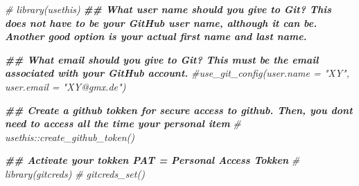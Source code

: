 \documentclass[
]{article}
\newenvironment{Shaded}{\begin{snugshade}}{\end{snugshade}}
\newcommand{\CommentTok}[1]{\textcolor[rgb]{0.56,0.35,0.01}{\textit{#1}}}
\newcommand{\DocumentationTok}[1]{\textcolor[rgb]{0.56,0.35,0.01}{\textbf{\textit{#1}}}}
\begin{document}
\begin{Shaded}
\begin{Highlighting}[]
\CommentTok{\# library(usethis)}
\DocumentationTok{\#\# What user name should you give to Git? This does not have to be your GitHub user name, although it can be. Another good option is your actual first name and last name.}

\DocumentationTok{\#\# What email should you give to Git? This must be the email associated with your GitHub account.}
\CommentTok{\#use\_git\_config(user.name = "XY", user.email = "XY@gmx.de")}

\DocumentationTok{\#\# Create a github tokken for secure access to github. Then, you don\textquotesingle{}t need to access all the time your personal item}
\CommentTok{\# usethis::create\_github\_token()}

\DocumentationTok{\#\# Activate your tokken PAT = Personal Access Tokken}
\CommentTok{\# library(gitcreds)}
\CommentTok{\# gitcreds\_set()}
\end{Highlighting}
\end{Shaded}
\end{document}
